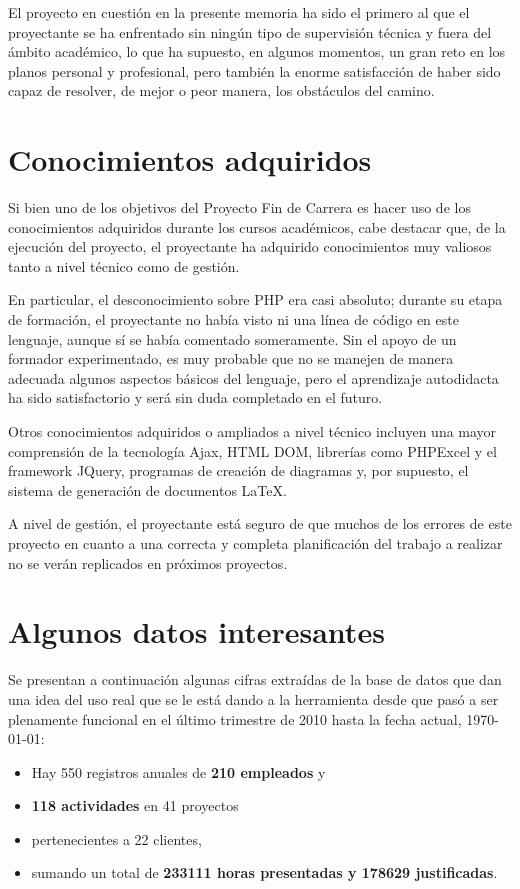 El proyecto en cuestión en la presente memoria ha sido el primero al que el
proyectante se ha enfrentado sin ningún tipo de supervisión técnica y fuera del
ámbito académico, lo que ha supuesto, en algunos momentos, un gran reto en los
planos personal y profesional, pero también la enorme satisfacción de
haber sido capaz de resolver, de mejor o peor manera, los obstáculos del camino.

\section{Conocimientos adquiridos}

Si bien uno de los objetivos del Proyecto Fin de Carrera es hacer uso de los
conocimientos adquiridos durante los cursos académicos, cabe destacar que, de la
ejecución del proyecto, el proyectante ha adquirido conocimientos muy valiosos
tanto a nivel técnico como de gestión.

En particular, el desconocimiento sobre PHP era casi absoluto; durante su etapa
de formación, el proyectante no había visto ni una línea de código en este
lenguaje, aunque sí se había comentado someramente. Sin el apoyo de un
formador experimentado, es muy probable que no se manejen de manera adecuada
algunos aspectos básicos del lenguaje, pero el aprendizaje autodidacta ha sido
satisfactorio y será sin duda completado en el futuro.

Otros conocimientos adquiridos o ampliados a nivel técnico incluyen una mayor
comprensión de la tecnología Ajax, HTML DOM, librerías como PHPExcel y el
framework JQuery, programas de creación de diagramas y, por supuesto, el
sistema de generación de documentos \LaTeX.

A nivel de gestión, el proyectante está seguro de que muchos de los errores de
este proyecto en cuanto a una correcta y completa planificación del trabajo a
realizar no se verán replicados en próximos proyectos.

\section{Algunos datos interesantes}

Se presentan a continuación algunas cifras extraídas de la base de datos que dan
una idea del uso real que se le está dando a la herramienta desde que pasó a ser
plenamente funcional en el último trimestre de 2010 hasta la fecha actual,
\today:

\begin{itemize}
\item Hay 550 registros anuales de \textbf{210 empleados} y
\item \textbf{118 actividades} en 41 proyectos
\item pertenecientes a 22 clientes,
\item sumando un total de \textbf{233111 horas presentadas y 178629
justificadas}.
\end{itemize}


